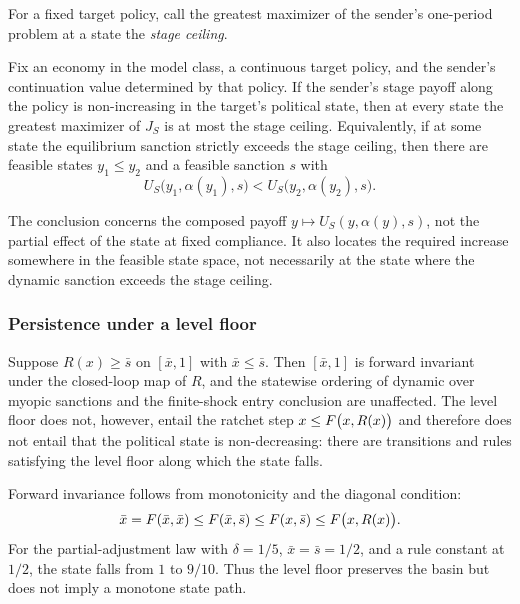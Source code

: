 For a fixed target policy, call the greatest maximizer of the sender's
one-period problem at a state the \emph{stage ceiling}.

\begin{proposition}
\label{prop:dynamic-stake}
Fix an economy in the model class, a continuous target policy, and the
sender's continuation value determined by that policy. If the sender's
stage payoff along the policy is non-increasing in the target's political
state, then at every state the greatest maximizer of $J_S$
is at most the stage ceiling. Equivalently, if at some state the
equilibrium sanction strictly exceeds the stage ceiling, then there are
feasible states $y_1\le y_2$ and a feasible sanction $s$ with
\[
U_S\bigl(y_1,\alpha(y_1),s\bigr)
<U_S\bigl(y_2,\alpha(y_2),s\bigr).
\]
\end{proposition}

The conclusion concerns the composed payoff
$y\mapsto U_S(y,\alpha(y),s)$, not the partial effect of the state at
fixed compliance. It also locates the required increase somewhere in
the feasible state space, not necessarily at the state where the
dynamic sanction exceeds the stage ceiling.

\subsubsection{Persistence under a level floor}
\label{sec:weak-floor}

\begin{proposition}
\label{prop:level-floor}
Suppose $R(x)\ge\bar s$ on $[\bar x,1]$ with $\bar x\le\bar s$.
Then $[\bar x,1]$ is forward invariant under the closed-loop
map of $R$, and the statewise ordering of dynamic over myopic sanctions and
the finite-shock entry conclusion are unaffected. The level floor does
not, however, entail the ratchet step
$x\le F\bigl(x,R(x)\bigr)$ and therefore does not entail that the
political state is non-decreasing: there are transitions and rules
satisfying the level floor along which the state falls.
\end{proposition}

Forward invariance follows from monotonicity and the diagonal condition:
\[
\bar x=F(\bar x,\bar x)
\le F(\bar x,\bar s)
\le F(x,\bar s)
\le F\bigl(x,R(x)\bigr).
\]
For the partial-adjustment law with $\delta=1/5$, $\bar x=\bar s=1/2$, and a rule
constant at $1/2$, the state falls from $1$ to $9/10$. Thus the level
floor preserves the basin but does not imply a monotone state path.

